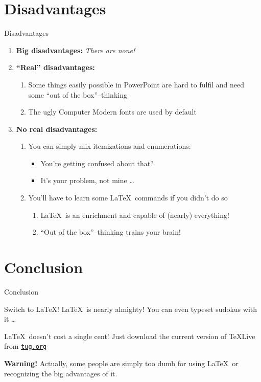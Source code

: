 \documentclass[11pt]{beamer}
\begin{document}
	\section{Disadvantages}
	\begin{frame}{Disadvantages}
		\begin{enumerate}
			\item \textbf{Big disadvantages:}
			\textit{There are none!}
			
			\item \textbf{\enquote{Real} disadvantages:}
			\begin{enumerate}
				\item Some things easily possible in PowerPoint are hard to fulfil and need some \enquote{out of the box}--thinking
				\item The ugly Computer Modern fonts are used by default
			\end{enumerate}
			
			\item \textbf{No real disadvantages:}
			\begin{enumerate}
				\item You can simply mix itemizations and enumerations:
				\begin{itemize}
					\item You're getting confused about that?
					\item It's your problem, not mine \dots
				\end{itemize}
				
				\item You'll have to learn some \LaTeX\ commands if you didn't do so
				\begin{enumerate}
					\item \LaTeX\ is an enrichment and capable of (nearly) everything!
					\item \enquote{Out of the box}--thinking trains your brain!
				\end{enumerate}				
			\end{enumerate}
		\end{enumerate}
	\end{frame}
	
	\section{Conclusion}
	\begin{frame}{Conclusion}
		\begin{block}{Switch to \LaTeX!}
			\LaTeX\ is nearly almighty! You can even typeset sudokus with it \dots
		\end{block}
	
		\begin{exampleblock}{\LaTeX\ doesn't cost a single cent!}
			Just download the current version of \TeX Live from \href{http://tug.org}{\texttt{tug.org}}
		\end{exampleblock}
	
		\begin{alertblock}{\textbf{Warning!}}
			Actually, some people are simply too dumb for using \LaTeX\ or recognizing the big advantages of it.
		\end{alertblock}
	\end{frame}
	
\end{document}

